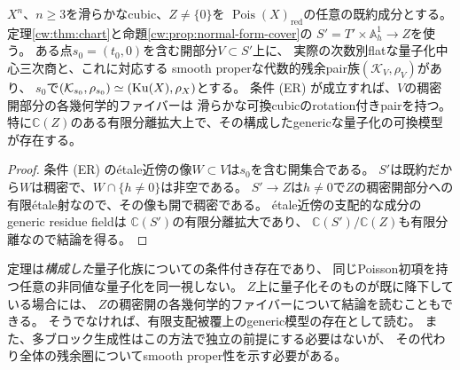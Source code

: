 \begin{theorem}[支配的chart上の一可換点によるgeneric復元]
\label{thm:all-components-conditional}\label{cw:thm:generic}
$X^n$、$n\ge3$を滑らかなcubic、$Z\ne\{0\}$を
$\operatorname{Pois}(X)_{\mathrm{red}}$の任意の既約成分とする。
定理\ref{cw:thm:chart}と命題\ref{cw:prop:normal-form-cover}の
$S'=T'\times\mathbb A^1_h\to Z$を使う。
ある点$s_0=(t_0,0)$を含む開部分$V\subset S'$上に、
実際の次数別flatな量子化中心三次商と、これに対応する
smooth properな代数的残余pair族$(\mathcal K_V,\rho_V)$があり、
$s_0$で$(\mathcal K_{s_0},\rho_{s_0})\simeq(\operatorname{Ku}(X),\rho_X)$とする。
条件 (ER) が成立すれば、$V$の稠密開部分の各幾何学的ファイバーは
滑らかな可換cubicのrotation付きpairを持つ。
特に$\mathbb C(Z)$のある有限分離拡大上で、その構成したgenericな量子化の可換模型が存在する。
\end{theorem}
\begin{proof}
条件 (ER) のétale近傍の像$W\subset V$は$s_0$を含む開集合である。
$S'$は既約だから$W$は稠密で、$W\cap\{h\ne0\}$は非空である。
$S'\to Z$は$h\ne0$で$Z$の稠密開部分への有限étale射なので、その像も開で稠密である。
étale近傍の支配的な成分のgeneric residue fieldは
$\mathbb C(S')$の有限分離拡大であり、
$\mathbb C(S')/\mathbb C(Z)$も有限分離なので結論を得る。
\end{proof}
\begin{remark}[量化と降下]
\label{rem:all-components-gap}
定理は\emph{構成した}量子化族についての条件付き存在であり、
同じPoisson初項を持つ任意の非同値な量子化を同一視しない。
$Z$上に量子化そのものが既に降下している場合には、
$Z$の稠密開の各幾何学的ファイバーについて結論を読むこともできる。
そうでなければ、有限支配被覆上のgeneric模型の存在として読む。
また、多ブロック生成性はこの方法で独立の前提にする必要はないが、
その代わり全体の残余圏についてsmooth proper性を示す必要がある。
\end{remark}

